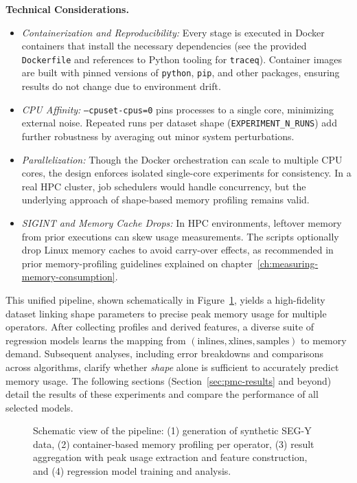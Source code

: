 \vspace{1em}
\noindent
\textbf{Technical Considerations.}
\begin{itemize}
    \item \emph{Containerization and Reproducibility:}
    Every stage is executed in Docker containers that install the necessary dependencies (see the provided \texttt{Dockerfile} and references to Python tooling for \texttt{traceq}).
    Container images are built with pinned versions of \texttt{python}, \texttt{pip}, and other packages, ensuring results do not change due to environment drift.
    \item \emph{\ac{CPU} Affinity:}
    \texttt{--cpuset-cpus=0} pins processes to a single core, minimizing external noise.
    Repeated runs per dataset shape (\texttt{EXPERIMENT\_N\_RUNS}) add further robustness by averaging out minor system perturbations.
    \item \emph{Parallelization:}
    Though the Docker orchestration can scale to multiple \ac{CPU} cores, the design enforces isolated single-core experiments for consistency.
    In a real \ac{HPC} cluster, job schedulers would handle concurrency, but the underlying approach of shape-based memory profiling remains valid.
    \item \emph{SIGINT and Memory Cache Drops:}
    In \ac{HPC} environments, leftover memory from prior executions can skew usage measurements.
    The scripts optionally drop Linux memory caches to avoid carry-over effects, as recommended in prior memory-profiling guidelines explained on chapter~\ref{ch:measuring-memory-consumption}.
\end{itemize}

\vspace{1em}
\noindent
This unified pipeline, shown schematically in Figure~\ref{fig:pmc_datapipeline}, yields a high-fidelity dataset linking shape parameters to precise peak memory usage for multiple operators.
After collecting profiles and derived features, a diverse suite of regression models learns the mapping from $(\text{inlines}, \text{xlines}, \text{samples})$ to memory demand.
Subsequent analyses, including error breakdowns and comparisons across algorithms, clarify whether \emph{shape} alone is sufficient to accurately predict memory usage.
The following sections (Section~\ref{sec:pmc-results} and beyond) detail the results of these experiments and compare the performance of all selected models.

\begin{figure}[htbp]
    \centering
    \fbox{\rule{0pt}{1in}\rule{.9\linewidth}{0pt}}
    \caption{Schematic view of the pipeline: (1) generation of synthetic SEG-Y data, (2) container-based memory profiling per operator, (3) result aggregation with peak usage extraction and feature construction, and (4) regression model training and analysis.}
    \label{fig:pmc_datapipeline}
\end{figure}

